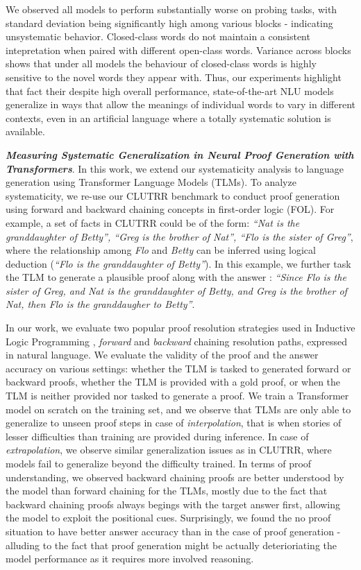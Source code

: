 \documentclass[12pt]{article}
\newcommand{\xhdr}[1]{{\noindent\bfseries #1}.}
\begin{document}
We observed all models to perform substantially worse on probing tasks, with standard deviation being significantly high among various blocks - indicating unsystematic behavior. Closed-class words do not maintain a consistent intepretation when paired with different open-class words. Variance across blocks shows that under all models the behaviour of closed-class words is highly sensitive to the novel words they appear with. Thus, our experiments highlight that fact their despite high overall performance, state-of-the-art NLU models generalize in ways that allow the meanings of individual words to vary in different contexts, even in an artificial language where a totally systematic solution is available.

\xhdr{\textit{Measuring Systematic Generalization in Neural Proof Generation with Transformers}} \cite{gontier2020} In this work, we extend our systematicity analysis to language generation using Transformer Language Models (TLMs). To analyze systematicity, we re-use our CLUTRR benchmark to conduct proof generation using forward and backward chaining concepts in first-order logic (FOL). For example, a set of facts in CLUTRR could be of the form: \textit{``Nat is the granddaughter of Betty'', ``Greg is the brother of Nat'', ``Flo is the sister of Greg''}, where the relationship among \textit{Flo} and \textit{Betty} can be inferred using logical deduction (\textit{``Flo is the granddaughter of Betty''}). In this example, we further task the TLM to generate a plausible proof along with the answer : \textit{``Since Flo is the sister of Greg, and Nat is the granddaughter of Betty, and Greg is the brother of Nat, then Flo is the granddaugher to Betty''}.

In our work, we evaluate two popular proof resolution strategies used in Inductive Logic Programming \cite{Evans2017-pu} , \textit{forward} and \textit{backward} chaining resolution paths, expressed in natural language. We evaluate the validity of the proof and the answer accuracy on various settings: whether the TLM is tasked to generated forward or backward proofs, whether the TLM is provided with a gold proof, or when the TLM is neither provided nor tasked to generate a proof. We train a Transformer \cite{vaswani2017attention} model on scratch on the training set, and we observe that TLMs are only able to generalize to unseen proof steps in case of \textit{interpolation}, that is when stories of lesser difficulties than training are provided during inference. In case of \textit{extrapolation}, we observe similar generalization issues as in CLUTRR, where models fail to generalize beyond the difficulty trained. In terms of proof understanding, we observed backward chaining proofs are better understood by the model than forward chaining for the TLMs, mostly due to the fact that backward chaining proofs always begings with the target answer first, allowing the model to exploit the positional cues. Surprisingly, we found the no proof situation to have better answer accuracy than in the case of proof generation - alluding to the fact that proof generation might be actually deterioriating the model performance as it requires more involved reasoning.
\end{document}
